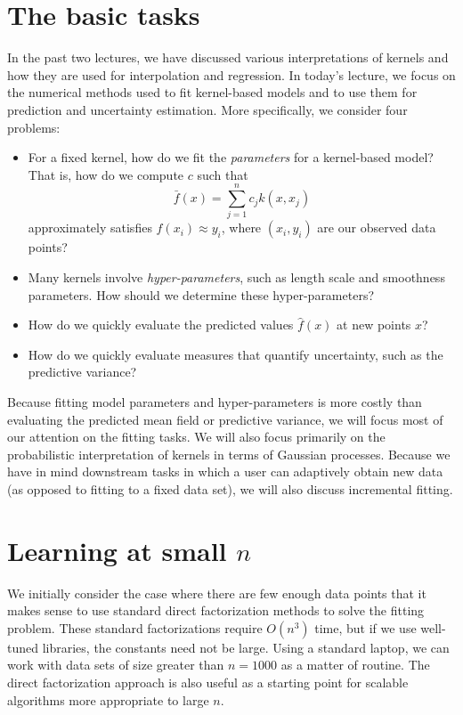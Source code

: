 \documentclass[12pt, leqno]{article} %
\begin{document}


\section{The basic tasks}

In the past two lectures, we have discussed various interpretations of
kernels and how they are used for interpolation and regression.  In
today's lecture, we focus on the numerical methods used to fit
kernel-based models and to use them for prediction and uncertainty
estimation.  More specifically, we consider four problems:
\begin{itemize}
\item
  For a fixed kernel, how do we fit the {\em parameters} for a
  kernel-based model?  That is, how do we compute $c$ such that
  \[
    \bar{f}(x) = \sum_{j=1}^n c_j k(x, x_j)
  \]
  approximately satisfies $\hat{f}(x_i) \approx y_i$, where $(x_i, y_i)$
  are our observed data points?
\item
  Many kernels involve {\em hyper-parameters}, such as length scale
  and smoothness parameters.  How should we determine these hyper-parameters?
\item
  How do we quickly evaluate the predicted values $\hat{f}(x)$ at
  new points $x$?
\item
  How do we quickly evaluate measures that quantify uncertainty,
  such as the predictive variance?
\end{itemize}
Because fitting model parameters and hyper-parameters is more costly
than evaluating the predicted mean field or predictive variance, we
will focus most of our attention on the fitting tasks.  We will also
focus primarily on the probabilistic interpretation of kernels in
terms of Gaussian processes.  Because we have in mind downstream tasks
in which a user can adaptively obtain new data (as opposed to fitting
to a fixed data set), we will also discuss incremental fitting.

\section{Learning at small $n$}

We initially consider the case where there are few enough data points
that it makes sense to use standard direct factorization methods to solve the
fitting problem.  These standard factorizations require $O(n^3)$ time,
but if we use well-tuned libraries, the constants need not be large.
Using a standard laptop, we can work with data sets of size greater
than $n = 1000$ as a matter of routine.  The direct
factorization approach is also useful as a starting point for scalable
algorithms more appropriate to large $n$.
\end{document}
